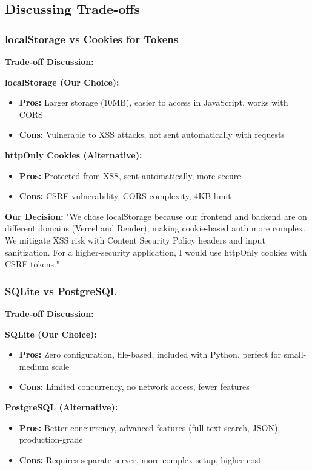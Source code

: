 \documentclass[11pt,a4paper]{article}
\begin{document}
\subsection{Discussing Trade-offs}

\subsubsection{localStorage vs Cookies for Tokens}
\textbf{Trade-off Discussion:}

\textbf{localStorage (Our Choice):}
\begin{itemize}[leftmargin=*]
    \item \textbf{Pros:} Larger storage (10MB), easier to access in JavaScript, works with CORS
    \item \textbf{Cons:} Vulnerable to XSS attacks, not sent automatically with requests
\end{itemize}

\textbf{httpOnly Cookies (Alternative):}
\begin{itemize}[leftmargin=*]
    \item \textbf{Pros:} Protected from XSS, sent automatically, more secure
    \item \textbf{Cons:} CSRF vulnerability, CORS complexity, 4KB limit
\end{itemize}

\textbf{Our Decision:} "We chose localStorage because our frontend and backend are on different domains (Vercel and Render), making cookie-based auth more complex. We mitigate XSS risk with Content Security Policy headers and input sanitization. For a higher-security application, I would use httpOnly cookies with CSRF tokens."


\subsubsection{SQLite vs PostgreSQL}
\textbf{Trade-off Discussion:}

\textbf{SQLite (Our Choice):}
\begin{itemize}[leftmargin=*]
    \item \textbf{Pros:} Zero configuration, file-based, included with Python, perfect for small-medium scale
    \item \textbf{Cons:} Limited concurrency, no network access, fewer features
\end{itemize}

\textbf{PostgreSQL (Alternative):}
\begin{itemize}[leftmargin=*]
    \item \textbf{Pros:} Better concurrency, advanced features (full-text search, JSON), production-grade
    \item \textbf{Cons:} Requires separate server, more complex setup, higher cost
\end{itemize}
\end{document}
